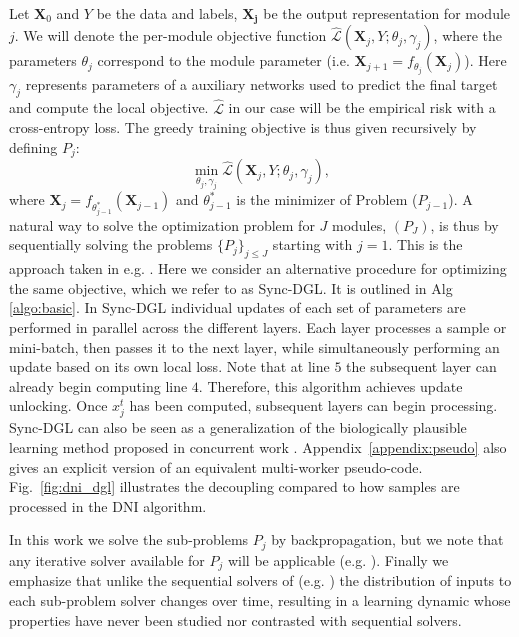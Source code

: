 \documentclass{article}
\begin{document}
Let $\bm{X}_0$ and $Y$  be the data and labels, $\bm{X_j}$ be the output representation for module $j$. We will denote the per-module objective function $\hat{\mathcal{L}}(\bm{X}_{j}, Y;\theta_{j},\gamma_{j})$, where the parameters $\theta_j$ correspond to the module parameter (i.e. $\bm{X}_{j+1} =f_{\theta_{j}}(\bm{X}_{j})$). Here $\gamma_j$ represents parameters of a auxiliary networks used to predict the final target and compute the local objective. $\hat{\mathcal{L}}$ in our case will be the empirical risk with a cross-entropy loss. The greedy training objective is thus given recursively by defining $P_j$:
\begin{equation}
\min_{\theta_j,\gamma_j}\hat{\mathcal{L}}(\bm{X}_{j}, Y;\theta_{j},\gamma_{j})\tag{$P_j$}\label{eq:dap},
\end{equation}
where $\bm{X}_{j} =f_{\theta_{j-1}^*}(\bm{X}_{j-1})$ and $\theta_{j-1}^*$ is the minimizer of Problem  
(\(P_{j-1}\)). 
A natural way to solve the optimization problem for $J$ modules, $(P_J)$, is thus by sequentially solving the problems $\{P_{j}\}_{j\leq J}$ starting with $j=1$. This is the approach taken in e.g. \citet{Marquez,huang2017learning,bengio2007greedy,shallow}. 
Here we consider an alternative procedure for optimizing the same objective, which we refer to as Sync-DGL. It is outlined in Alg \ref{algo:basic}. In Sync-DGL individual updates of each set of parameters are performed in parallel across the different layers. Each layer processes a sample or mini-batch, then passes it to the next layer, while simultaneously performing an update based on its own local loss. Note that at line $5$ the subsequent layer can already begin computing line $4$. Therefore, this algorithm achieves update unlocking. Once $x_j^t$ has been computed,   subsequent layers can begin processing. Sync-DGL can also be seen as a generalization of the biologically plausible learning method proposed in concurrent work \citep{nokland2019training}.
Appendix~\ref{appendix:pseudo} also gives an explicit version of an equivalent multi-worker pseudo-code. Fig.~\ref{fig:dni_dgl} illustrates the decoupling compared to how samples are processed in the DNI algorithm. 

 In this work we solve the sub-problems $P_j$ by backpropagation, but we note that any iterative solver available for $P_j$ will be applicable (e.g. \cite{choromanska2018beyond}).
 Finally we emphasize that unlike the sequential solvers of (e.g. \citet{bengio2007greedy,shallow}) the distribution of inputs to each sub-problem solver changes over time, resulting in a learning dynamic whose properties have never been studied nor contrasted with sequential solvers.
\end{document}
